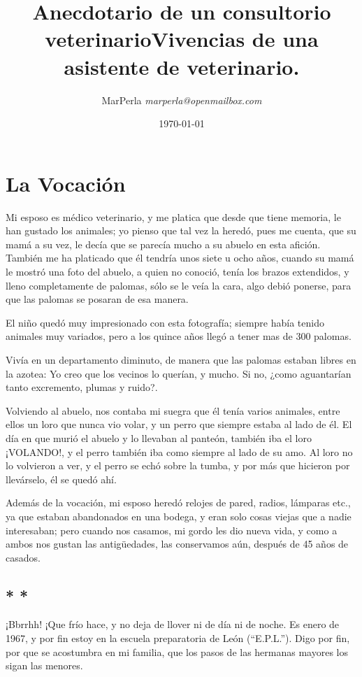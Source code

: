 \documentclass[letterpaper, 12pt]{book}
\title{{\sffamily \huge Anecdotario de un consultorio veterinario}{\calligra{}Vivencias de una asistente de veterinario.}}
\author{{\Large  MarPerla }\textit{marperla@openmailbox.com }}
\date{\today}
\begin{document}
\maketitle
\tableofcontents
\chapter{La Vocación}
Mi esposo es médico veterinario, y me platica que desde que tiene memoria, le han gustado los animales; yo pienso que tal vez la heredó, pues me cuenta, que su mamá a su vez, le decía que se parecía mucho a su abuelo en esta afición. También me ha platicado que él tendría unos siete u ocho años, cuando su mamá le mostró una foto del abuelo, a quien no conoció, tenía los brazos extendidos, y lleno completamente de palomas, sólo se le veía la cara, algo debió ponerse, para que las palomas se posaran de esa manera. 

El niño quedó muy impresionado con esta fotografía; siempre había tenido animales muy variados, pero a los quince años llegó a tener mas de 300 palomas. 

Vivía en un departamento diminuto, de manera que las palomas estaban libres en la azotea: Yo creo que los vecinos lo querían, y mucho. Si no, ¿como aguantarían tanto excremento, plumas y ruido?.

Volviendo al  abuelo, nos contaba mi suegra que él tenía varios animales, entre ellos un loro que nunca vio volar, y un perro que siempre estaba al lado de él. El día en que murió el abuelo y lo llevaban al panteón, también iba el loro ¡VOLANDO!, y el perro también iba como siempre al lado de su amo. Al loro no lo volvieron a ver, y el perro se echó sobre la tumba, y por más que hicieron por llevárselo, él se quedó ahí. 

Además de la vocación, mi esposo heredó relojes de pared, radios, lámparas etc., ya que estaban abandonados en una bodega, y eran solo cosas viejas que a nadie interesaban; pero cuando nos casamos, mi gordo les dio nueva vida, y como a ambos nos gustan las antigüedades, las conservamos aún, después de 45 años de casados.

\section*{\centering * * *}
¡Bbrrhh! ¡Que frío hace, y no deja de llover ni de día ni de noche. Es enero de 1967, y por fin estoy en la escuela preparatoria de León (``E.P.L.''). Digo por fin, por que se acostumbra en mi familia, que los pasos de las hermanas mayores los sigan las menores.
\end{document}
